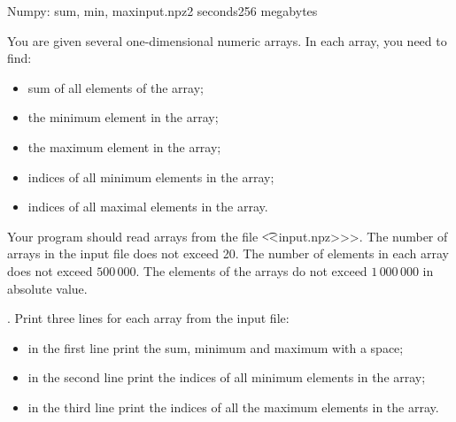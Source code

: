 \begin{problem}{Numpy: sum, min, max}{input.npz}{}{2 seconds}{256 megabytes}

You are given several one-dimensional numeric arrays. In each array, you need to find:
\begin{itemize} 
\item sum of all elements of the array;
\item the minimum element in the array;
\item the maximum element in the array;
\item indices of all minimum elements in the array;
\item indices of all maximal elements in the array.
\end{itemize}

\InputFile
Your program should read arrays from the file {\t {<<input.npz>>>}}.
The number of arrays in the input file does not exceed 20.
The number of elements in each array does not exceed $500\,000$.
The elements of the arrays do not exceed $1\,000\,000$ in absolute value.

\OutputFile.
Print three lines for each array from the input file:
\begin{itemize} 
\item in the first line print the sum, minimum and maximum with a space;
\item in the second line print the indices of all minimum elements in the array;
\item in the third line print the indices of all the maximum elements in the array.
\end{itemize}


\Example
\begin{example}
%
\end{example}

\end{problem}

